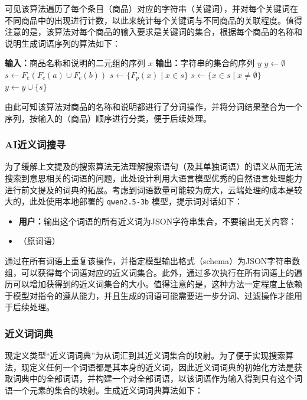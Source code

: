 可见该算法遍历了每个条目（商品）对应的字符串（关键词），并对每个关键词在不同商品中的出现进行计数，以此来统计每个关键词与不同商品的关联程度。值得注意的是，该算法对每个商品的输入要求是关键词的集合，根据每个商品的名称和说明生成词语序列的算法如下：

\vspace{1em}
\begin{algorithmic}[1]
	\STATE \textbf{输入：}商品名称和说明的二元组的序列 $x$
	\STATE \textbf{输出：}字符串的集合的序列 $y$
	\STATE $y \gets \emptyset$
		\STATE $s \gets F_e(F_c(a) \cup F_c(b))$
		\STATE $s \gets \{F_p(x) \mid x \in s\}$
		\STATE $s \gets \{x \in s \mid x \neq \emptyset\}$
		\STATE $y \gets y \cup \{s\}$
	\ENDFOR
\end{algorithmic}
\vspace{1em}

由此可知该算法对商品的名称和说明都进行了分词操作，并将分词结果整合为一个序列，按输入的（商品）顺序进行分类，便于后续处理。

\subsubsection{AI近义词搜寻}

为了缓解上文提及的搜索算法无法理解搜索语句（及其单独词语）的语义从而无法搜索到意思相关的词语的问题，此处设计利用大语言模型优秀的自然语言处理能力进行前文提及的词典的拓展。考虑到词语数量可能较为庞大，云端处理的成本是较大的，此处使用本地部署的 \verb|qwen2.5-3b| 模型，提示词对话如下：

\begin{itemize}
	\item[] \textbf{用户：}输出这个词语的所有近义词为JSON字符串集合，不要输出无关内容：
	\item[]（原词语）
\end{itemize}

通过在所有词语上重复该操作，并指定模型输出格式（schema）为JSON字符串数组，可以获得每个词语对应的近义词集合。此外，通过多次执行在所有词语上的遍历可以增加获得到的近义词集合的大小。值得注意的是，这种方法一定程度上依赖于模型对指令的遵从能力，并且生成的词语可能需要进一步分词、过滤操作才能用于后续处理。

\subsubsection{近义词词典}

现定义类型“近义词词典”为从词汇到其近义词集合的映射。为了便于实现搜索算法，现定义任何一个词语都是其本身的近义词，因此近义词词典的初始化方法是获取词典中的全部词语，并构建一个对全部词语，以该词语作为输入得到只有这个词语一个元素的集合的映射。生成近义词词典算法如下：


